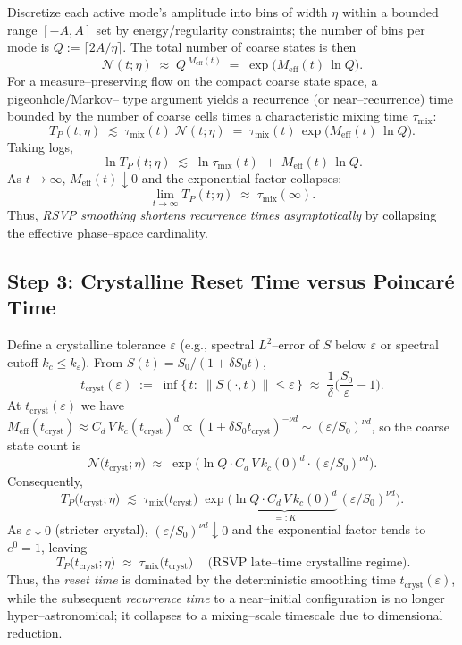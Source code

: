 \documentclass[a4paper,11pt,openany]{book}
\begin{document}
Discretize each active mode’s amplitude into bins of width $\eta$ within a bounded range
$[-A,A]$ set by energy/regularity constraints; the number of bins per mode is
$Q := \lceil 2A/\eta\rceil$. The total number of coarse states is then
\[
\mathcal{N}(t;\eta) \;\approx\; Q^{\,M_{\text{eff}}(t)}
\;=\; \exp\!\Big(M_{\text{eff}}(t)\,\ln Q\Big).
\]
For a measure–preserving flow on the compact coarse state space, a pigeonhole/Markov–
type argument yields a recurrence (or near–recurrence) time bounded by the number of coarse
cells times a characteristic mixing time $\tau_{\text{mix}}$:
\[
T_P(t;\eta) \;\lesssim\; \tau_{\text{mix}}(t)\;\mathcal{N}(t;\eta)
\;=\; \tau_{\text{mix}}(t)\,\exp\!\Big(M_{\text{eff}}(t)\,\ln Q\Big).
\]
Taking logs,
\[
\ln T_P(t;\eta) \;\lesssim\; \ln \tau_{\text{mix}}(t) \;+\; M_{\text{eff}}(t)\,\ln Q.
\]
As $t\to\infty$, $M_{\text{eff}}(t)\!\downarrow 0$ and the exponential factor collapses:
\[
\lim_{t\to\infty} T_P(t;\eta) \;\approx\; \tau_{\text{mix}}(\infty).
\]
Thus, \emph{RSVP smoothing shortens recurrence times asymptotically} by collapsing the effective
phase–space cardinality.

\subsection{Step 3: Crystalline Reset Time versus Poincaré Time}

Define a crystalline tolerance $\varepsilon$ (e.g., spectral $L^2$–error of $S$ below $\varepsilon$
or spectral cutoff $k_c \le k_\varepsilon$). From $S(t)=S_0/(1+\delta S_0 t)$,
\[
t_{\text{cryst}}(\varepsilon)
\;:=\; \inf\{\,t:\;\|S(\cdot,t)\| \le \varepsilon\,\}
\;\approx\; \frac{1}{\delta}\Big(\frac{S_0}{\varepsilon} - 1\Big).
\]
At $t_{\text{cryst}}(\varepsilon)$ we have $M_{\text{eff}}(t_{\text{cryst}})\approx 
C_d\,V\,k_c(t_{\text{cryst}})^d \propto (1+\delta S_0 t_{\text{cryst}})^{-\nu d}
\sim (\varepsilon/S_0)^{\nu d}$, so the coarse state count is
\[
\mathcal{N}\big(t_{\text{cryst}};\eta\big) 
\;\approx\; \exp\!\Big(\ln Q \cdot C_d\,V\,k_c(0)^d \cdot (\varepsilon/S_0)^{\nu d}\Big).
\]
Consequently,
\[
T_P\big(t_{\text{cryst}};\eta\big) 
\;\lesssim\; \tau_{\text{mix}}\big(t_{\text{cryst}}\big)\;
\exp\!\Big(\underbrace{\ln Q \cdot C_d\,V\,k_c(0)^d}_{=:K}\,(\varepsilon/S_0)^{\nu d}\Big).
\]
As $\varepsilon\!\downarrow\!0$ (stricter crystal), $(\varepsilon/S_0)^{\nu d}\!\downarrow\!0$ and the exponential factor tends to $e^{0}=1$, leaving
\[
\boxed{\,T_P\big(t_{\text{cryst}};\eta\big) \;\approx\; \tau_{\text{mix}}\big(t_{\text{cryst}}\big)\,}
\quad\text{(RSVP late–time crystalline regime).}
\]
Thus, the \emph{reset time} is dominated by the deterministic smoothing time $t_{\text{cryst}}(\varepsilon)$,
while the subsequent \emph{recurrence time} to a near–initial configuration is no longer
hyper–astronomical; it collapses to a mixing–scale timescale due to dimensional reduction.
\end{document}
